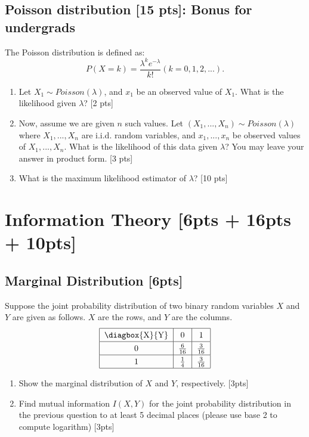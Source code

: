 \documentclass{article}
\begin{document}
\newpage

\subsection{Poisson distribution [15 pts]: Bonus for undergrads}
The Poisson distribution is defined as:
$$P(X=k)=\frac{\lambda^k e^{-\lambda}}{k!} (k=0,1,2,...).$$
\begin{enumerate}[label=(\alph*)]
    \item Let $X_1 \sim Poisson(\lambda)$, and $x_1$ be an observed value of $X_1$. What is the likelihood given $\lambda$? [2 pts]
    \item Now, assume we are given $n$ such values. Let $(X_1, ...,X_n)\sim Poisson(\lambda)$ where $X_1, ...,X_n$ are i.i.d. random variables, and $x_1,...,x_n$ be observed values of $X_1, ...,X_n$. What is the likelihood of this data given $\lambda$? You may leave your answer in product form. [3 pts]
    \item What is the maximum likelihood estimator of $\lambda$? [10 pts]
\end{enumerate}




\newpage

\section{Information Theory [6pts + 16pts + 10pts]}
\subsection{Marginal Distribution [6pts]}

Suppose the joint probability distribution of two binary random variables $X$ and $Y$ are given as follows. $X$ are the rows, and $Y$ are the columns.
$$\renewcommand*{\arraystretch}{1.3}
\begin{tabular}{|c|c|c|}
    \hline 
    \diagbox{X}{Y} & {0} & {1} \\ 
    \hline 0 & {$\frac{6}{16}$} & {$\frac{3}{16}$} \\ 
    \hline 1 & {$\frac{1}{4}$} & {$\frac{3}{16}$} \\ 
    \hline
\end{tabular}$$

\begin{enumerate}[label=(\alph*)]
    \item Show the marginal distribution of $X$ and $Y$, respectively. [3pts]
    \item Find mutual information $I(X,Y)$ for the joint probability distribution in the previous question to at least 5 decimal places (please use base 2 to compute logarithm) [3pts]
\end{enumerate}
\end{document}
